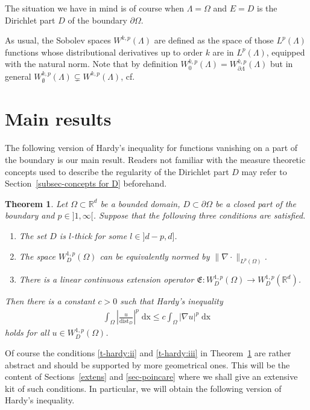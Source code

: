 \documentclass[10pt,leqno]{amsart}
\newtheorem{theorem}{Theorem}[section]
\theoremstyle{definition}
\numberwithin{equation}{section}
\begin{document}
The situation we have in mind is of course when $\Lambda = \Omega$ and $E = D$
is the Dirichlet part $D$ of the boundary $\partial \Omega$. 

As usual, the Sobolev spaces $W^{k,p}(\Lambda)$ are defined as the
space of those
$L^p(\Lambda)$ functions whose distributional derivatives up to order $k$ are in
$L^p(\Lambda)$, equipped with the natural norm. Note that by definition
$W^{k,p}_0(\Lambda) = W^{k,p}_{\partial \Lambda}(\Lambda)$ but in general
$W^{k,p}_\emptyset(\Lambda) \subsetneq W^{k,p}(\Lambda)$,
cf.\ \cite[Sec.~1.1.6]{mazsob}

\section{Main results} \label{sec-hart}
\noindent The following version of Hardy's inequality for functions vanishing on
a part of the boundary is our main result. Readers not familiar with the
measure theoretic concepts used to describe the regularity of the Dirichlet
part $D$ may refer to Section~\ref{subsec-concepts for D}
beforehand.

\begin{theorem} \label{t-hardy}
 Let $\Omega \subset {{\mathbb R}}^d$ be a bounded domain, $D \subset \partial \Omega$ be a
 closed part of the boundary and $p \in {]1,\infty[}$. Suppose that the
following
 three conditions are satisfied.
 \begin{enumerate} 
 \item \label{t-hardy:i} The set $D$ is $l$-thick for some $l \in
{]d-p,d]}$.
 \item \label{t-hardy:ii} The space $W^{1,p}_D(\Omega)$ can be equivalently
	normed by $\|\nabla \cdot \|_{L^p(\Omega)}$.
 \item \label{t-hardy:iii} There is a linear continuous extension operator
$\mathfrak E :
	W^{1,p}_D(\Omega) \to W^{1,p}_D({{\mathbb R}}^d)$.
 \end{enumerate}
 Then there is a constant $c>0$ such that Hardy's inequality
 \begin{align}\label{e-hardy0}
  \int_\Omega \left| \frac{u}{{\operatorname{dist}}_D} \right|^p \; {{\mathrm{d}}} \mathrm{x} \le c
	\int_\Omega |\nabla u|^p \; {{\mathrm{d}}} \mathrm{x}
 \end{align}
 holds for all $u \in W^{1,p}_D(\Omega)$.
\end{theorem}

Of course the conditions \ref{t-hardy:ii} and \ref{t-hardy:iii} in
Theorem~\ref{t-hardy} are rather abstract and should be supported by more
geometrical ones. This will be the content of Sections~\ref{extens} and
\ref{sec-poincare} where we shall give an extensive kit of such conditions. In
particular, we will obtain the following version of
Hardy's inequality. 
\end{document}
